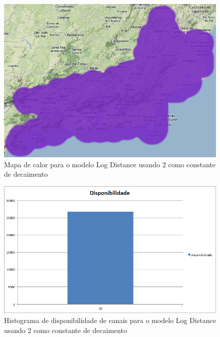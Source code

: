 \begin{figure}[htb]
\centering
\includegraphics[width=1.0\textwidth]{figs/logdist2heatmap}
\caption[Mapa de calor para o modelo Log Distance usando 2 como constante de decaimento]
{Mapa de calor para o modelo Log Distance usando 2 como constante de decaimento}
\label{fig:LogDist2heatmap}
\end{figure} 

\begin{figure}[htb]
\centering
\includegraphics[width=1.0\textwidth]{figs/histogramalogdist2}
\caption[Histograma de disponibilidade de canais para o modelo Log Distance usando 2 como constante de decaimento]
{Histograma de disponibilidade de canais para o modelo Log Distance usando 2 como constante de decaimento}
\label{fig:histogramalogdist2}
\end{figure} 


\FloatBarrier

